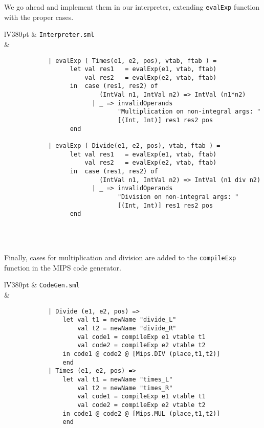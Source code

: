 \documentclass[a4paper]{article}
\begin{document}
We go ahead and implement them in our interpreter, extending \verb|evalExp| function with the proper cases.

\begin{center}	
	\begin{tabular}{lV{380pt}}
		\toprule
		& \verb|Interpreter.sml|\\
		\midrule
		&
		\begin{verbatim}
			| evalExp ( Times(e1, e2, pos), vtab, ftab ) =
			      let val res1   = evalExp(e1, vtab, ftab)
			          val res2   = evalExp(e2, vtab, ftab)
			      in  case (res1, res2) of
			              (IntVal n1, IntVal n2) => IntVal (n1*n2)
			            | _ => invalidOperands
			                   "Multiplication on non-integral args: " 
			                   [(Int, Int)] res1 res2 pos
			      end
			  
			| evalExp ( Divide(e1, e2, pos), vtab, ftab ) =
			      let val res1   = evalExp(e1, vtab, ftab)
			          val res2   = evalExp(e2, vtab, ftab)
			      in  case (res1, res2) of
			              (IntVal n1, IntVal n2) => IntVal (n1 div n2)
			            | _ => invalidOperands
			                   "Division on non-integral args: " 
			                   [(Int, Int)] res1 res2 pos
			      end
		\end{verbatim}
		\\
		\bottomrule \\
	\end{tabular}
\end{center}

Finally, cases for multiplication and division are added to the \verb|compileExp| function in the MIPS code generator.

\begin{center}	
	\begin{tabular}{lV{380pt}}
		\toprule
		& \verb|CodeGen.sml|\\
		\midrule
		&
		\begin{verbatim}
			| Divide (e1, e2, pos) =>
			    let val t1 = newName "divide_L"
			        val t2 = newName "divide_R"
			        val code1 = compileExp e1 vtable t1
			        val code2 = compileExp e2 vtable t2
			    in code1 @ code2 @ [Mips.DIV (place,t1,t2)]
			    end
			| Times (e1, e2, pos) =>
			    let val t1 = newName "times_L"
			        val t2 = newName "times_R"
			        val code1 = compileExp e1 vtable t1
			        val code2 = compileExp e2 vtable t2
			    in code1 @ code2 @ [Mips.MUL (place,t1,t2)]
			    end
		\end{verbatim}
		\\
		\bottomrule \\
	\end{tabular}
\end{center}
\end{document}
